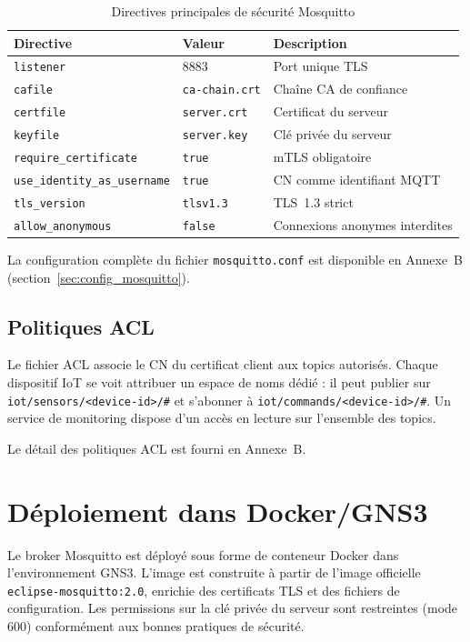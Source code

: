 \begin{table}[H]
\centering
\caption{Directives principales de sécurité Mosquitto}
\label{tab:mosquitto_directives}
\begin{tabular}{llp{5.5cm}}
\toprule
\textbf{Directive} & \textbf{Valeur} & \textbf{Description} \\
\midrule
\texttt{listener} & 8883 & Port unique TLS \\
\texttt{cafile} & \texttt{ca-chain.crt} & Chaîne CA de confiance \\
\texttt{certfile} & \texttt{server.crt} & Certificat du serveur \\
\texttt{keyfile} & \texttt{server.key} & Clé privée du serveur \\
\texttt{require\_certificate} & \texttt{true} & mTLS obligatoire \\
\texttt{use\_identity\_as\_username} & \texttt{true} & CN comme identifiant MQTT \\
\texttt{tls\_version} & \texttt{tlsv1.3} & TLS~1.3 strict \\
\texttt{allow\_anonymous} & \texttt{false} & Connexions anonymes interdites \\
\bottomrule
\end{tabular}
\end{table}

La configuration complète du fichier \texttt{mosquitto.conf} est disponible en Annexe~B (section~\ref{sec:config_mosquitto}).

\subsection{Politiques ACL}

Le fichier ACL associe le CN du certificat client aux topics autorisés. Chaque dispositif IoT se voit attribuer un espace de noms dédié : il peut publier sur \texttt{iot/sensors/<device-id>/\#} et s'abonner à \texttt{iot/commands/<device-id>/\#}. Un service de monitoring dispose d'un accès en lecture sur l'ensemble des topics.

Le détail des politiques ACL est fourni en Annexe~B.

\section{Déploiement dans Docker/GNS3}

Le broker Mosquitto est déployé sous forme de conteneur Docker dans l'environnement GNS3. L'image est construite à partir de l'image officielle \texttt{eclipse-mosquitto:2.0}, enrichie des certificats TLS et des fichiers de configuration. Les permissions sur la clé privée du serveur sont restreintes (mode 600) conformément aux bonnes pratiques de sécurité.

